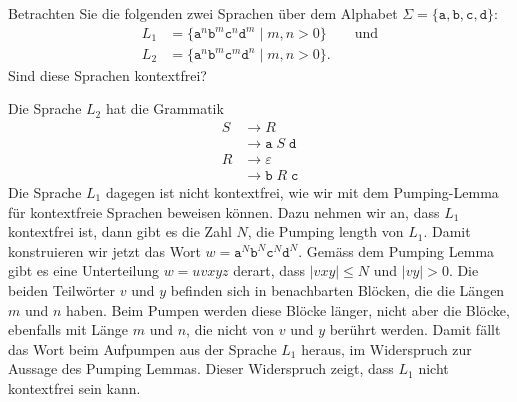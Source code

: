 Betrachten Sie die folgenden zwei Sprachen über dem Alphabet
$\Sigma=\{\texttt{a},\texttt{b},\texttt{c}, \texttt{d}\}$:
\begin{align*}
L_1
&=
\{ \texttt{a}^n\texttt{b}^m\texttt{c}^n\texttt{d}^m
\;|\; m,n>0
\}
\qquad\text{und}
\\
L_2
&=
\{ \texttt{a}^n\texttt{b}^m\texttt{c}^m\texttt{d}^n
\;|\; m,n>0
\}.
\end{align*}
Sind diese Sprachen kontextfrei?

\begin{loesung}
Die Sprache $L_2$ hat die Grammatik
\begin{align*}
S&\rightarrow R
\\
 &\rightarrow \texttt{a}\; S \;\texttt{d}
\\
R&\rightarrow \varepsilon
\\
 &\rightarrow \texttt{b}\; R \;\texttt{c}
\end{align*}
Die Sprache $L_1$ dagegen ist nicht kontextfrei, wie wir mit dem Pumping-Lemma
für kontextfreie Sprachen beweisen können.
Dazu nehmen wir an, dass $L_1$ kontextfrei ist, dann gibt es die Zahl $N$,
die Pumping length von $L_1$.
Damit konstruieren wir jetzt das Wort
$w=
\texttt{a}^N
\texttt{b}^N
\texttt{c}^N
\texttt{d}^N
$.
Gemäss dem Pumping Lemma gibt es eine Unterteilung $w=uvxyz$ derart,
dass $|vxy|\le N$ und $|vy|>0$.
Die beiden Teilwörter $v$ und $y$ befinden sich in benachbarten Blöcken,
die die Längen $m$ und $n$ haben.
Beim Pumpen werden diese Blöcke länger, nicht aber die Blöcke, ebenfalls
mit Länge $m$ und $n$, die nicht von $v$ und $y$ berührt werden.
Damit fällt das Wort beim Aufpumpen aus der Sprache $L_1$ heraus, im
Widerspruch zur Aussage des Pumping Lemmas.
Dieser Widerspruch zeigt, dass $L_1$  nicht kontextfrei sein kann.
\end{loesung}




